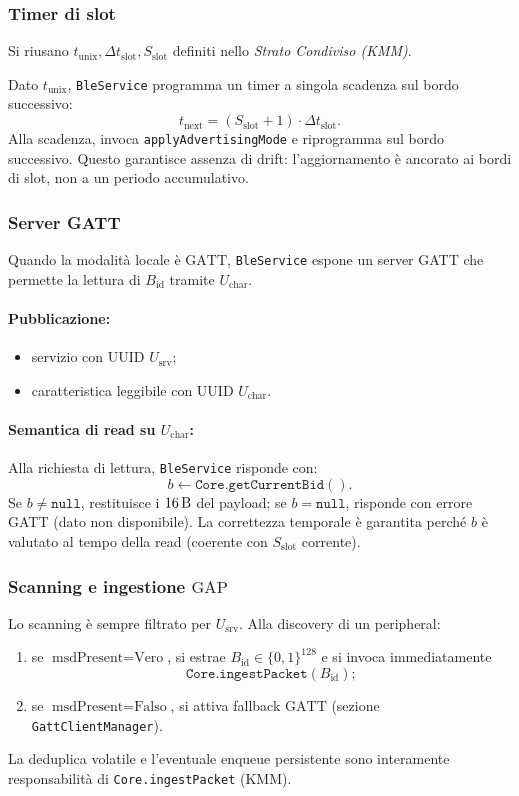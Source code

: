 \documentclass[a4paper,11pt,table,dvipsnames]{article}
\begin{document}
\subsubsection{Timer di slot}
Si riusano \(t_{\text{unix}}, \Delta t_{\text{slot}}, S_{\text{slot}}\) definiti nello \emph{Strato Condiviso (KMM)}.

Dato \(t_{\text{unix}}\), \texttt{BleService} programma un timer a singola scadenza sul bordo successivo:
\[
    t_{\text{next}} = (S_{\text{slot}} + 1)\cdot \Delta t_{\text{slot}}.
\]
Alla scadenza, invoca \texttt{applyAdvertisingMode} e riprogramma sul bordo successivo. Questo garantisce assenza di drift: l’aggiornamento è ancorato ai bordi di slot, non a un periodo accumulativo.

\subsubsection{Server GATT}
Quando la modalità locale è \(\mathrm{GATT}\), \texttt{BleService} espone un server GATT che permette la lettura di \(B_{\text{id}}\) tramite \(U_{\text{char}}\).

\paragraph{Pubblicazione:}
\begin{itemize}[nosep]
    \item servizio con UUID \(U_{\text{srv}}\);
    \item caratteristica leggibile con UUID \(U_{\text{char}}\).
\end{itemize}

\paragraph{Semantica di read su \(U_{\text{char}}\):}
Alla richiesta di lettura, \texttt{BleService} risponde con:
\[
    b \leftarrow \texttt{Core.getCurrentBid}().
\]
Se \(b\neq\texttt{null}\), restituisce i \(\SI{16}{\byte}\) del payload; se \(b=\texttt{null}\), risponde con errore GATT (dato non disponibile). La correttezza temporale è garantita perché \(b\) è valutato al tempo della read (coerente con \(S_{\text{slot}}\) corrente).

\subsubsection{Scanning e ingestione \(\mathrm{GAP}\)}
Lo scanning è sempre filtrato per \(U_{\text{srv}}\).
Alla discovery di un peripheral:
\begin{enumerate}
    \item se \(\text{msdPresent}=\text{Vero}\), si estrae \(B_{\text{id}}\in\{0,1\}^{128}\) e si invoca immediatamente
          \[
              \texttt{Core.ingestPacket}(B_{\text{id}});
          \]
    \item se \(\text{msdPresent}=\text{Falso}\), si attiva fallback \(\mathrm{GATT}\) (sezione \texttt{GattClientManager}).
\end{enumerate}
La deduplica volatile e l’eventuale enqueue persistente sono interamente responsabilità di \texttt{Core.ingestPacket} (KMM).
\end{document}
